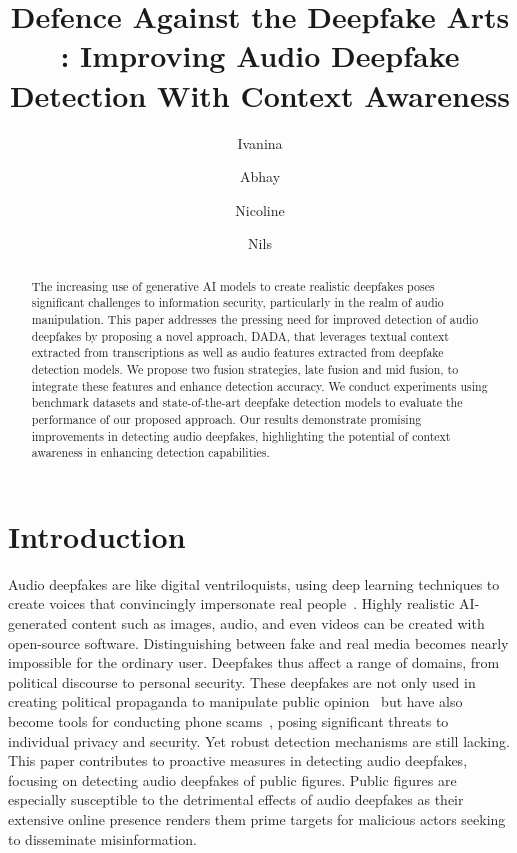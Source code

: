 \documentclass{Interspeech}
\title{Defence Against the Deepfake Arts : Improving Audio Deepfake Detection With Context Awareness}
\author[affiliation={1*}]{Ivanina}{Ivanova}
\author[affiliation={1*}]{Abhay}{Dayal Mathur}
\author[affiliation={1, 2*}]{Nicoline}{Nymand-Andersen}
\author[affiliation={1}]{Nils}{Holzenberger}
\affiliation{Telecom Paris}{Institut Polytechnique de Paris}{France}
\affiliation{Department of Computer Science}{Technische Universität München}{Germany}
\begin{document}
\maketitle

\begin{abstract}

  The increasing use of generative AI models to create realistic deepfakes poses significant challenges to information security, particularly in the realm of audio manipulation. This paper addresses the pressing need for improved detection of audio deepfakes by proposing a novel approach, DADA, that leverages textual context extracted from transcriptions as well as audio features extracted from deepfake detection models. We propose two fusion strategies, late fusion and mid fusion, to integrate these features and enhance detection accuracy. We conduct experiments using benchmark datasets and state-of-the-art deepfake detection models to evaluate the performance of our proposed approach. Our results demonstrate promising improvements in detecting audio deepfakes, highlighting the potential of context awareness in enhancing detection capabilities.
\end{abstract}

\section{Introduction}
\label{sec:introduction}


Audio deepfakes are like digital ventriloquists, using deep learning techniques
to create voices that convincingly impersonate real people~\cite{adversarial}.
Highly realistic AI-generated content such as images, audio, and even videos
can be created with open-source software. Distinguishing
between fake and real media becomes nearly impossible for the ordinary user.
Deepfakes thus affect a range of domains, from political discourse to personal
security. These deepfakes are not only used in creating political propaganda to
manipulate public opinion~\cite{stuanescuinformational} but have also become
tools for conducting phone scams~\cite{mirsky2022dfcaptcha}, posing significant
threats to individual privacy and security. Yet robust detection mechanisms are
still lacking. This paper contributes to proactive
measures in detecting audio deepfakes, focusing on detecting audio deepfakes of
public figures. Public figures are especially susceptible to the detrimental
effects of audio deepfakes as their extensive online presence renders them
prime targets for malicious actors seeking to disseminate misinformation.
\end{document}
